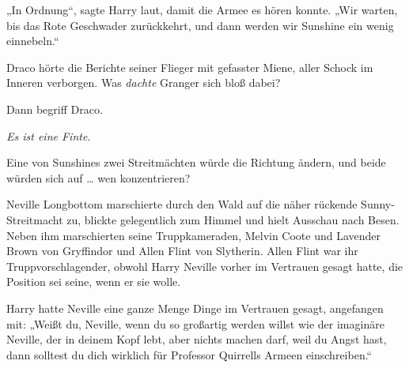 „In Ordnung“, sagte Harry laut, damit die Armee es hören konnte.
„Wir warten, bis das Rote Geschwader zurückkehrt, und dann werden wir Sunshine ein wenig einnebeln.“

\later

Draco hörte die Berichte seiner Flieger mit gefasster Miene, aller Schock im Inneren verborgen. Was \emph{dachte} Granger sich bloß dabei?

Dann begriff Draco.

\emph{Es ist eine Finte.}

Eine von Sunshines zwei Streitmächten würde die Richtung ändern, und beide würden sich auf … wen konzentrieren?

\later

Neville Longbottom marschierte durch den Wald auf die näher rückende Sunny-Streitmacht zu, blickte gelegentlich zum Himmel und hielt Ausschau nach Besen. Neben ihm marschierten seine Truppkameraden, Melvin Coote und Lavender Brown von Gryffindor und Allen Flint von Slytherin. Allen Flint war ihr Truppvorschlagender, obwohl Harry Neville vorher im Vertrauen gesagt hatte, die Position sei seine, wenn er sie wolle.

Harry hatte Neville eine ganze Menge Dinge im Vertrauen gesagt, angefangen mit: „Weißt du, Neville, wenn du so großartig werden willst wie der imaginäre Neville, der in deinem Kopf lebt, aber nichts machen darf, weil du Angst hast, dann solltest du dich wirklich für Professor Quirrells Armeen einschreiben.“

